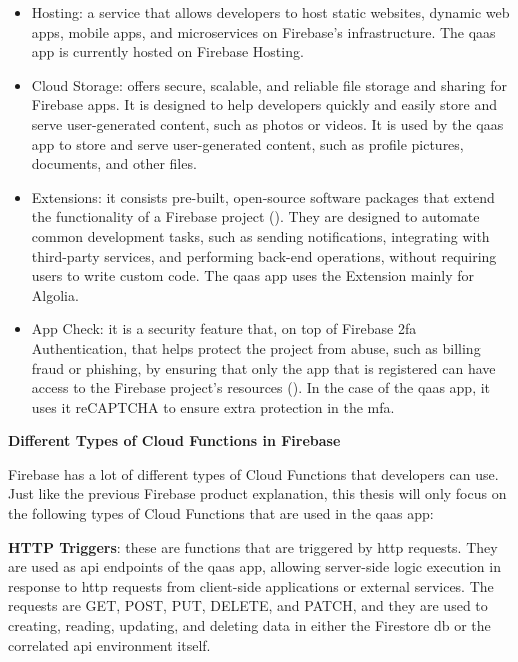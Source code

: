 \begin{itemize}
      \item Hosting: a service that allows developers to host static websites, dynamic web apps, mobile apps, and
            microservices on Firebase's infrastructure. The \acrshort{qaas} app is currently hosted on Firebase
            Hosting.
      \item Cloud Storage: offers secure, scalable, and reliable file storage and sharing for Firebase apps.
            It is designed to help developers quickly and easily store and serve user-generated content, such as
            photos or videos. It is used by the \acrshort{qaas} app to store and serve user-generated content, such as
            profile pictures, documents, and other files.
      \item Extensions: it consists pre-built, open-source software packages that extend the functionality of a Firebase
            project (\textit{\cite{firebaseExtension}}). They are designed to automate common development tasks, such as
            sending notifications, integrating with third-party services, and performing back-end operations, without
            requiring users to write custom code. The \acrshort{qaas} app uses the Extension mainly for Algolia.
      \item App Check: it is a security feature that, on top of Firebase \acrshort{2fa} Authentication, that helps protect
            the project from abuse, such as billing fraud or phishing, by ensuring that only the app that is registered
            can have access to the Firebase project's resources (\textit{\cite{appCheckFirebase}}). In the case of the
            \acrshort{qaas} app, it uses it \gls{reCAPTCHA} to ensure extra protection in the \acrshort{mfa}.
\end{itemize}

\textbf{Different Types of Cloud Functions in Firebase}

Firebase has a lot of different types of Cloud Functions that developers can use. Just like the previous Firebase product
explanation, this thesis will only focus on the following types of Cloud Functions that are used in the \acrshort{qaas} app:

\textbf{HTTP Triggers}: these are functions that are triggered by \acrshort{http} requests. They are used as \acrshort{api}
endpoints of the \acrshort{qaas} app, allowing server-side logic execution in response to \acrshort{http} requests from
client-side applications or external services. The requests are GET, POST, PUT, DELETE, and PATCH, and they are used to
creating, reading, updating, and deleting data in either the Firestore \acrshort{db} or the correlated \acrshort{api}
environment itself.


